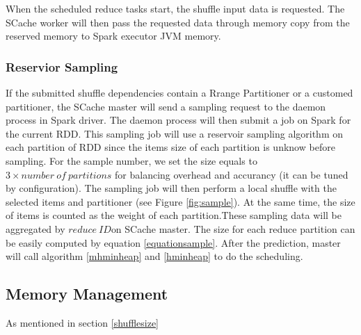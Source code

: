 \documentclass[10pt,twocolumn]{article}
\begin{document}
When the scheduled reduce tasks start, the shuffle input data is requested. The SCache worker will then pass the requested data through memory copy from the reserved memory to Spark executor JVM memory. 

\subsubsection{Reservior Sampling}\label{sampling}
If the submitted shuffle dependencies contain a Rrange Partitioner or a customed partitioner, the SCache master will send a sampling request to the daemon process in Spark driver. The daemon process will then submit a job on Spark for the current RDD. This sampling job will use a reservoir sampling algorithm\cite{reservoir} on each partition of RDD since the items size of each partition is unknow before sampling. For the sample number, we set the size equals to $3 \times number\ of\ partitions$ for balancing overhead and accurancy (it can be tuned by configuration). The sampling job will then perform a local shuffle with the selected items and partitioner (see Figure \ref{fig:sample}). At the same time, the size of items is counted as the weight of each partition.These sampling data will be aggregated by $reduce\ ID$on SCache master. The size for each reduce partition can be easily computed by equation \ref{equationsample}. After the prediction, master will call algorithm \ref{mhminheap} and \ref{hminheap} to do the scheduling. 

\subsection{Memory Management}
As mentioned in section \ref{shufflesize}
\end{document}
